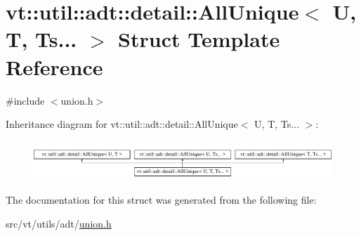 \hypertarget{structvt_1_1util_1_1adt_1_1detail_1_1_all_unique_3_01_u_00_01_t_00_01_ts_8_8_8_01_4}{}\section{vt\+:\+:util\+:\+:adt\+:\+:detail\+:\+:All\+Unique$<$ U, T, Ts... $>$ Struct Template Reference}
\label{structvt_1_1util_1_1adt_1_1detail_1_1_all_unique_3_01_u_00_01_t_00_01_ts_8_8_8_01_4}


{\ttfamily \#include $<$union.\+h$>$}

Inheritance diagram for vt\+:\+:util\+:\+:adt\+:\+:detail\+:\+:All\+Unique$<$ U, T, Ts... $>$\+:\begin{figure}[H]
\begin{center}
\leavevmode
\includegraphics[height=1.481482cm]{structvt_1_1util_1_1adt_1_1detail_1_1_all_unique_3_01_u_00_01_t_00_01_ts_8_8_8_01_4}
\end{center}
\end{figure}


The documentation for this struct was generated from the following file\+:\begin{DoxyCompactItemize}
\item 
src/vt/utils/adt/\hyperlink{union_8h}{union.\+h}\end{DoxyCompactItemize}
